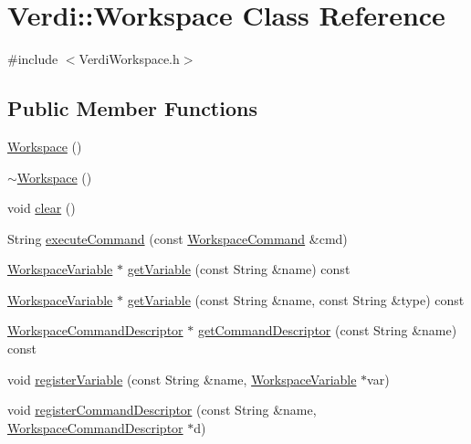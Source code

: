 \hypertarget{class_verdi_1_1_workspace}{\section{\-Verdi\-:\-:\-Workspace \-Class \-Reference}
\label{class_verdi_1_1_workspace}
}


{\ttfamily \#include $<$\-Verdi\-Workspace.\-h$>$}

\subsection*{\-Public \-Member \-Functions}
\begin{DoxyCompactItemize}
\item 
\hyperlink{class_verdi_1_1_workspace_ab699a787f796ccd00d2a234b987b2b64}{\-Workspace} ()
\item 
\hyperlink{class_verdi_1_1_workspace_adb1d687a4bb84d18f11e2cc18cb1273d}{$\sim$\-Workspace} ()
\item 
void \hyperlink{class_verdi_1_1_workspace_a2de55a2e24fd01526903c3e96d7cd09d}{clear} ()
\item 
\-String \hyperlink{class_verdi_1_1_workspace_a856fdf3ab72955ca2d5e27f9d1b50915}{execute\-Command} (const \hyperlink{class_verdi_1_1_workspace_command}{\-Workspace\-Command} \&cmd)
\item 
\hyperlink{class_verdi_1_1_workspace_variable}{\-Workspace\-Variable} $\ast$ \hyperlink{class_verdi_1_1_workspace_a75953d13025383a53843b851a3d77d80}{get\-Variable} (const \-String \&name) const 
\item 
\hyperlink{class_verdi_1_1_workspace_variable}{\-Workspace\-Variable} $\ast$ \hyperlink{class_verdi_1_1_workspace_abd7c14c8cefab29bb18f747451d65576}{get\-Variable} (const \-String \&name, const \-String \&type) const 
\item 
\hyperlink{class_verdi_1_1_workspace_command_descriptor}{\-Workspace\-Command\-Descriptor} $\ast$ \hyperlink{class_verdi_1_1_workspace_ac87cf047dd8d1aebbcb15f969481ada8}{get\-Command\-Descriptor} (const \-String \&name) const 
\item 
void \hyperlink{class_verdi_1_1_workspace_a3cc4c4b05c2bdf298da3593f8fe923aa}{register\-Variable} (const \-String \&name, \hyperlink{class_verdi_1_1_workspace_variable}{\-Workspace\-Variable} $\ast$var)
\item 
void \hyperlink{class_verdi_1_1_workspace_aea72e93c5efd0527affe91ed1d1fd04f}{register\-Command\-Descriptor} (const \-String \&name, \hyperlink{class_verdi_1_1_workspace_command_descriptor}{\-Workspace\-Command\-Descriptor} $\ast$d)

\end{DoxyCompactItemize}
